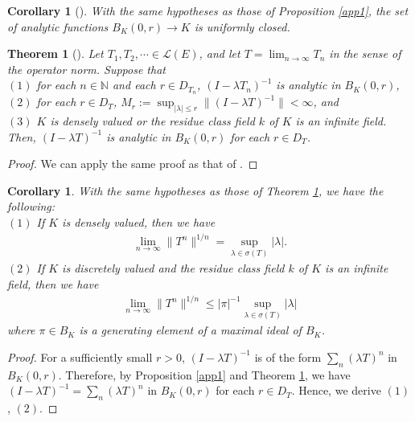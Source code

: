 \documentclass[12pt]{amsart}
\theoremstyle{plain}
\newtheorem{thm}[prop] {Theorem}
\newtheorem{cor}[prop]{Corollary}
\theoremstyle{definition}
\begin{document}
\begin{cor}[{\cite[Corollary 6.3]{comp}}]
  With the same hypotheses as those of Proposition \ref{app1}, the set of analytic functions $B_K(0,r) \to K$ is uniformly closed.
\end{cor}

\begin{thm}[{\cite[Lemma 6.9]{comp}}] \label{app2}
  Let $T_1, T_2, \cdots \in \mathcal{L}(E)$, and let $T = \lim_{n \to \infty} T_n$ in the sense of the operator norm. Suppose that \\
  $(1)$ for each $n \in \mathbb{N}$ and each $r \in D_{T_n}$, $(I - \lambda T_n)^{-1}$ is analytic in $B_K(0,r)$,  \\
  $(2)$ for each $r \in D_T$, $M_r := \sup_{|\lambda| \le r} \|(I - \lambda T)^{-1}\| < \infty$, and \\
  $(3)$ $K$ is densely valued or the residue class field $k$ of $K$ is an infinite field. \\
 Then, $(I - \lambda T)^{-1}$ is analytic in $B_K(0,r)$ for each $r \in D_T$.  
\end{thm}
\begin{proof}
  We can apply the same proof as that of \cite[Lemma 6.9]{comp}.
\end{proof}

\begin{cor} \label{app3}
  With the same hypotheses as those of Theorem \ref{app2}, we have the following: \\
  $(1)$ If $K$ is densely valued, then we have
  \begin{align*}
    \lim_{n \to \infty} \|T^n\|^{1/n} = \sup_{\lambda \in \sigma(T)} |\lambda|.
  \end{align*}
  $(2)$ If $K$ is discretely valued and the residue class field $k$ of $K$ is an infinite field, then we have
  \begin{align*}
    \lim_{n \to \infty} \|T^n\|^{1/n} \le |\pi|^{-1} \sup_{\lambda \in \sigma(T)} |\lambda|
  \end{align*}
  where $\pi \in B_K$ is a generating element of a maximal ideal of $B_K$.
\end{cor}
\begin{proof}
  For a sufficiently small $r > 0$, $(I - \lambda T)^{-1}$ is of the form $\sum_n (\lambda T)^n$ in $B_K(0,r)$. Therefore, by Proposition \ref{app1} and Theorem \ref{app2}, we have $(I - \lambda T)^{-1} = \sum_n (\lambda T)^n$ in $B_K(0,r)$ for each $r \in D_T$. Hence, we derive $(1)$, $(2)$.
\end{proof}
\end{document}

